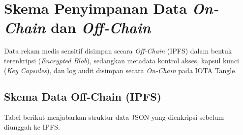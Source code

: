 \chapter{Skema Penyimpanan Data \textit{On-Chain} dan \textit{Off-Chain}}
\label{lampiran:skema-penyimpanan}

Data rekam medis sensitif disimpan secara \textit{Off-Chain} (IPFS) dalam bentuk terenkripsi (\textit{Encrypted Blob}), sedangkan metadata kontrol akses, kapsul kunci (\textit{Key Capsules}), dan log audit disimpan secara \textit{On-Chain} pada IOTA Tangle.

\section{Skema Data Off-Chain (IPFS)}
\label{sec:skema-offchain}

Tabel berikut menjabarkan struktur data JSON yang dienkripsi sebelum diunggah ke IPFS.


